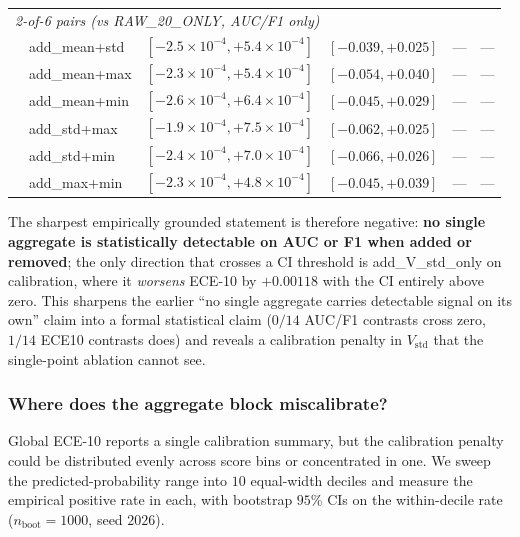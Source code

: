 \begin{table}[t]
\begin{tabular}{llcccc}
\midrule
\multicolumn{6}{l}{\emph{2-of-6 pairs (vs RAW\_20\_ONLY, AUC/F1 only)}} \\
& add\_mean+std & $[-2.5\!\times\!10^{-4}, +5.4\!\times\!10^{-4}]$ & $[-0.039, +0.025]$ & --- & --- \\
& add\_mean+max & $[-2.3\!\times\!10^{-4}, +5.4\!\times\!10^{-4}]$ & $[-0.054, +0.040]$ & --- & --- \\
& add\_mean+min & $[-2.6\!\times\!10^{-4}, +6.4\!\times\!10^{-4}]$ & $[-0.045, +0.029]$ & --- & --- \\
& add\_std+max  & $[-1.9\!\times\!10^{-4}, +7.5\!\times\!10^{-4}]$ & $[-0.062, +0.025]$ & --- & --- \\
& add\_std+min  & $[-2.4\!\times\!10^{-4}, +7.0\!\times\!10^{-4}]$ & $[-0.066, +0.026]$ & --- & --- \\
& add\_max+min  & $[-2.3\!\times\!10^{-4}, +4.8\!\times\!10^{-4}]$ & $[-0.045, +0.039]$ & --- & --- \\
\bottomrule
\end{tabular}
\end{table}

The sharpest empirically grounded statement is therefore negative:
\textbf{no single aggregate is statistically detectable on AUC or F1
when added or removed}; the only direction that crosses a CI
threshold is \textsf{add\_V\_std\_only} on calibration, where it
\emph{worsens} ECE-10 by $+0.00118$ with the CI entirely above zero.
This sharpens the earlier ``no single aggregate carries detectable
signal on its own'' claim into a formal statistical claim
($0/14$ AUC/F1 contrasts cross zero, $1/14$ ECE10 contrasts does)
and reveals a calibration penalty in $V_{\text{std}}$ that the single-point
ablation cannot see.

\subsubsection{Where does the aggregate block miscalibrate?}

Global ECE-10 reports a single calibration summary, but the
calibration penalty could be distributed evenly across score bins
or concentrated in one. We sweep the predicted-probability range
into $10$ equal-width deciles and measure the empirical positive
rate in each, with bootstrap $95$\% CIs on the within-decile rate
($n_{\text{boot}}{=}1000$, seed $2026$).

